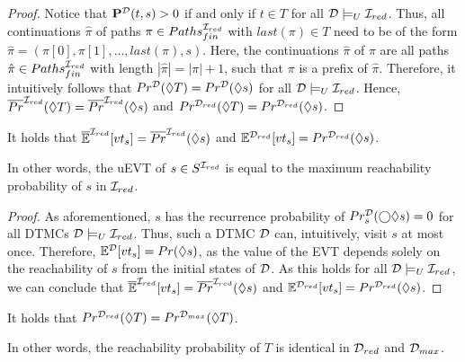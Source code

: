\begin{proof}
    Notice that $\mathbf{P}^{\mathcal{D}}(t,s)>0$ if and only if $t\in T$ for all $\mathcal{D} \models_U \mathcal{I}_{red}$. Thus, all continuations $\hat{\pi}$ of paths $\pi \in Paths_{fin}^{\mathcal{I}_{red}}$ with $last(\pi) \in T$ need to be of the form $\hat{\pi} = (\pi[0],\pi[1],\ldots,last(\pi),s)$. Here, the continuations $\hat{\pi}$ of $\pi$ are all paths $\hat{\pi}\in Paths_{fin}^{\mathcal{I}_{red}}$ with length $|\hat{\pi}| = |\pi|+1$, such that $\pi$ is a prefix of $\hat{\pi}$. Therefore, it intuitively follows that $Pr^{\mathcal{D}}(\lozenge T) = Pr^{\mathcal{D}}(\lozenge s)$ for all $\mathcal{D} \models_U \mathcal{I}_{red}$. Hence, $\overline{Pr}^{\mathcal{I}_{red}}(\lozenge T) = \overline{Pr}^{\mathcal{I}_{red}}(\lozenge s)$ and $Pr^{\mathcal{D}_{red}}(\lozenge T) = Pr^{\mathcal{D}_{red}}(\lozenge s)$.
\end{proof}

\begin{lemma}\label{lem:EVT_equal_to_reach_prob_for_reduction}
    It holds that $\mathbb{\overline{E}}^{\mathcal{I}_{red}}[vt_s] = \overline{Pr}^{\mathcal{I}_{red}}(\lozenge s)$ and $\mathbb{E}^{\mathcal{D}_{red}}[vt_s] = Pr^{\mathcal{D}_{red}}(\lozenge s)$.
\end{lemma}
In other words, the uEVT of $s \in S^{\mathcal{I}_{red}}$ is equal to the maximum reachability probability of $s$ in $\mathcal{I}_{red}$.

\begin{proof}
    As aforementioned, $s$ has the recurrence probability of $Pr^{\mathcal{D}}_s(\bigcirc\lozenge s) = 0$ for all DTMCs $\mathcal{D} \models_U \mathcal{I}_{red}$. Thus, such a DTMC $\mathcal{D}$ can, intuitively, visit $s$ at most once. Therefore,
    $\mathbb{E}^{\mathcal{D}}[vt_s] = Pr(\lozenge s)$, as the value of the EVT depends solely on the reachability of $s$ from the initial states of $\mathcal{D}$. As this holds for all $\mathcal{D} \models_U \mathcal{I}_{red}$, we can conclude that $\mathbb{\overline{E}}^{\mathcal{I}_{red}}[vt_s] = \overline{Pr}^{\mathcal{I}_{red}}(\lozenge s)$ and $\mathbb{E}^{\mathcal{D}_{red}}[vt_s] = Pr^{\mathcal{D}_{red}}(\lozenge s)$.
\end{proof}

\begin{lemma}\label{lem:equal_reach_prob_for_reduction}
    It holds that $Pr^{\mathcal{D}_{red}}(\lozenge T) = Pr^{\mathcal{D}_{max}}(\lozenge T)$.
\end{lemma}
In other words, the reachability probability of $T$ is identical in $\mathcal{D}_{red}$ and $\mathcal{D}_{max}$.

